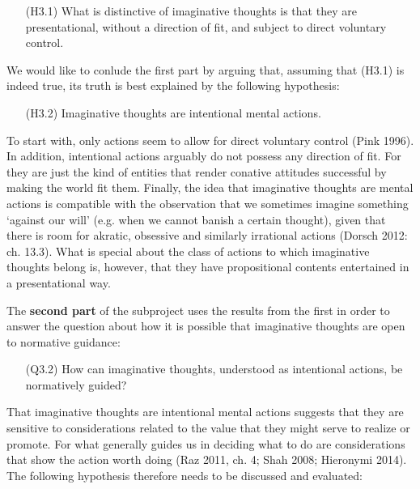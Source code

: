\vspace{-.1cm}
\begin{itemize}[leftmargin=2cm]
\item[(H3.1)] What is distinctive of imaginative thoughts is that they are presentational, without a direction of fit, and subject to direct
voluntary control.
\end{itemize}
\vspace{-.1cm}

\noindent We would like to conlude the first part by arguing that, assuming that (H3.1) is indeed true, its truth is best explained by the
following hypothesis:

\vspace{-.1cm}
\begin{itemize}[leftmargin=2cm]
\item[(H3.2)] Imaginative thoughts are intentional mental actions.
\end{itemize}
\vspace{-.1cm}

\noindent To start with, only actions seem to allow for direct voluntary control (Pink 1996). In addition, intentional actions arguably do not possess any direction of fit. For they are just the kind of entities that render conative attitudes successful by making the world fit them. Finally, the idea that imaginative thoughts are mental actions is compatible with the observation that we sometimes imagine something `against our will' (e.g. when we cannot banish a certain thought), given that there is room for akratic, obsessive and similarly irrational actions (Dorsch 2012: ch. 13.3). What is special about the class of actions to which imaginative thoughts belong is, however, that they have propositional contents entertained in a presentational way.

The \textbf{second part} of the subproject uses the results from the first in order to answer the question about how it is possible that imaginative thoughts are open to normative guidance:

\vspace{-.1cm}
\begin{itemize}[leftmargin=2cm]
\item[(Q3.2)] How can imaginative thoughts, understood as intentional actions, be normatively guided?
\end{itemize}
\vspace{-.1cm}

\noindent That imaginative thoughts are intentional mental actions suggests that they are sensitive to considerations related to the value that they might serve to realize or promote. For what generally guides us in deciding what to do are considerations that show the action worth doing (Raz 2011, ch. 4; Shah 2008; Hieronymi 2014). The following hypothesis therefore needs to be discussed and evaluated:

